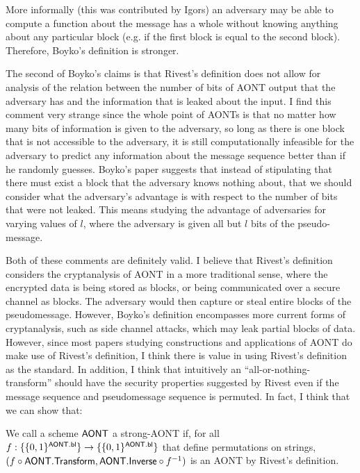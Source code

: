 \documentclass[11pt,twoside]{article}
\begin{document}
More informally (this was contributed by Igors) an adversary may be able to compute a function about the message has a whole without knowing anything about any particular block (e.g. if the first block is equal to the second block). Therefore, Boyko's definition is stronger. 

The second of Boyko's claims is that Rivest's definition does not allow for analysis of the relation between the number of bits of AONT output that the adversary has and the information that is leaked about the input. I find this comment very strange since the whole point of AONTs is that no matter how many bits of information is given to the adversary, so long as there is one block that is not accessible to the adversary, it is still computationally infeasible for the adversary to predict any information about the message sequence better than if he randomly guesses. Boyko's paper suggests that instead of stipulating that there must exist a block that the adversary knows nothing about, that we should consider what the adversary's advantage is with respect to the number of bits that were not leaked. This means studying the advantage of adversaries for varying values of $l$, where the adversary is given all but $l$ bits of the pseudo-message. 

Both of these comments are definitely valid. I believe that Rivest's definition considers the cryptanalysis of AONT in a more traditional sense, where the encrypted data is being stored as blocks, or being communicated over a secure channel as blocks. The adversary would then capture or steal entire blocks of the pseudomessage. However, Boyko's definition encompasses more current forms of cryptanalysis, such as side channel attacks, which may leak partial blocks of data. However, since most papers studying constructions and applications of AONT do make use of Rivest's definition, I think there is value in using Rivest's definition as the standard. In addition, I think that intuitively an ``all-or-nothing-transform'' should have the security properties suggested by Rivest even if the message sequence and pseudomessage sequence is permuted. In fact, I think that we can show that: 

\begin{definition}
We call a scheme $\mathsf{AONT}$ a strong-AONT if, for all $f:\{\{0,1\}^{\mathsf{AONT.bl}}\}\rightarrow\{\{0,1\}^{\mathsf{AONT.bl}}\}$ that define permutations on strings, $(f\circ\mathsf{AONT.Transform},\mathsf{AONT.Inverse}\circ f^{-1})$ is an AONT by Rivest's definition. 
\end{definition}
\end{document}
